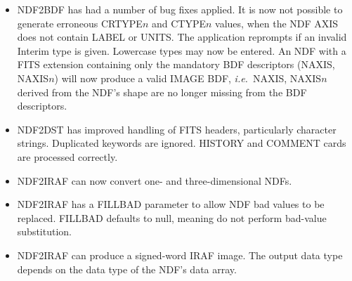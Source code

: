 \begin{itemize}
  \item NDF2BDF has had a number of bug fixes applied.  It is now not
        possible to generate erroneous CRTYPE$n$ and CTYPE$n$ values,
        when the NDF AXIS does not contain LABEL or UNITS.  The
        application reprompts if an invalid Interim type is given.
        Lowercase types may now be entered.  An NDF with a FITS
        extension containing only the mandatory BDF descriptors (NAXIS,
        NAXIS$n$) will now produce a valid IMAGE BDF, {\it i.e.}\ NAXIS,
        NAXIS$n$ derived from the NDF's shape are no longer missing from
        the BDF descriptors.

  \item NDF2DST has improved handling of FITS headers, particularly
        character strings.  Duplicated keywords are ignored.  HISTORY
        and COMMENT cards are processed correctly.

  \item NDF2IRAF can now convert one- and three-dimensional NDFs.

  \item NDF2IRAF has a FILLBAD parameter to allow NDF bad values to
        be replaced.  FILLBAD defaults to null, meaning do not perform
        bad-value substitution.

  \item NDF2IRAF can produce a signed-word IRAF image.  The output data
        type depends on the data type of the NDF's data array.

\end{itemize}


